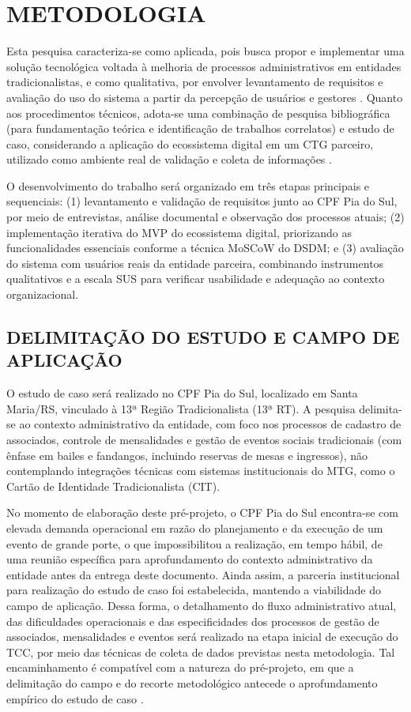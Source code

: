 ﻿\documentclass[12pt,a4paper]{article}
\begin{document}
\section{METODOLOGIA}

Esta pesquisa caracteriza-se como aplicada, pois busca propor e implementar uma solução tecnológica voltada à melhoria de processos administrativos em entidades tradicionalistas, e como qualitativa, por envolver levantamento de requisitos e avaliação do uso do sistema a partir da percepção de usuários e gestores \citep{gil2017,creswell2014}. Quanto aos procedimentos técnicos, adota-se uma combinação de pesquisa bibliográfica (para fundamentação teórica e identificação de trabalhos correlatos) e estudo de caso, considerando a aplicação do ecossistema digital em um CTG parceiro, utilizado como ambiente real de validação e coleta de informações \citep{yin2015}.

O desenvolvimento do trabalho será organizado em três etapas principais e sequenciais: (1) levantamento e validação de requisitos junto ao CPF Pia do Sul, por meio de entrevistas, análise documental e observação dos processos atuais; (2) implementação iterativa do MVP do ecossistema digital, priorizando as funcionalidades essenciais conforme a técnica MoSCoW do DSDM; e (3) avaliação do sistema com usuários reais da entidade parceira, combinando instrumentos qualitativos e a escala SUS para verificar usabilidade e adequação ao contexto organizacional.

\subsection{DELIMITAÇÃO DO ESTUDO E CAMPO DE APLICAÇÃO}

O estudo de caso será realizado no CPF Pia do Sul, localizado em Santa Maria/RS, vinculado à 13ª Região Tradicionalista (13ª RT). A pesquisa delimita-se ao contexto administrativo da entidade, com foco nos processos de cadastro de associados, controle de mensalidades e gestão de eventos sociais tradicionais (com ênfase em bailes e fandangos, incluindo reservas de mesas e ingressos), não contemplando integrações técnicas com sistemas institucionais do MTG, como o Cartão de Identidade Tradicionalista (CIT).

No momento de elaboração deste pré-projeto, o CPF Pia do Sul encontra-se com elevada demanda operacional em razão do planejamento e da execução de um evento de grande porte, o que impossibilitou a realização, em tempo hábil, de uma reunião específica para aprofundamento do contexto administrativo da entidade antes da entrega deste documento. Ainda assim, a parceria institucional para realização do estudo de caso foi estabelecida, mantendo a viabilidade do campo de aplicação. Dessa forma, o detalhamento do fluxo administrativo atual, das dificuldades operacionais e das especificidades dos processos de gestão de associados, mensalidades e eventos será realizado na etapa inicial de execução do TCC, por meio das técnicas de coleta de dados previstas nesta metodologia. Tal encaminhamento é compatível com a natureza do pré-projeto, em que a delimitação do campo e do recorte metodológico antecede o aprofundamento empírico do estudo de caso \citep{gil2017,yin2015}.
\end{document}
